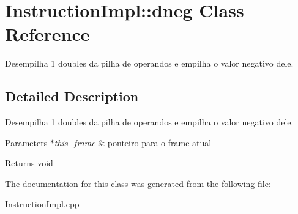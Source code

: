 \hypertarget{class_instruction_impl_1_1dneg}{}\section{Instruction\+Impl\+:\+:dneg Class Reference}
\label{class_instruction_impl_1_1dneg}


Desempilha 1 doubles da pilha de operandos e empilha o valor negativo dele.  




\subsection{Detailed Description}
Desempilha 1 doubles da pilha de operandos e empilha o valor negativo dele. 


\begin{DoxyParams}{Parameters}
{\em $\ast$this\+\_\+frame} & ponteiro para o frame atual \\
\hline
\end{DoxyParams}
\begin{DoxyReturn}{Returns}
void 
\end{DoxyReturn}


The documentation for this class was generated from the following file\+:\begin{DoxyCompactItemize}
\item 
\hyperlink{_instruction_impl_8cpp}{Instruction\+Impl.\+cpp}\end{DoxyCompactItemize}
